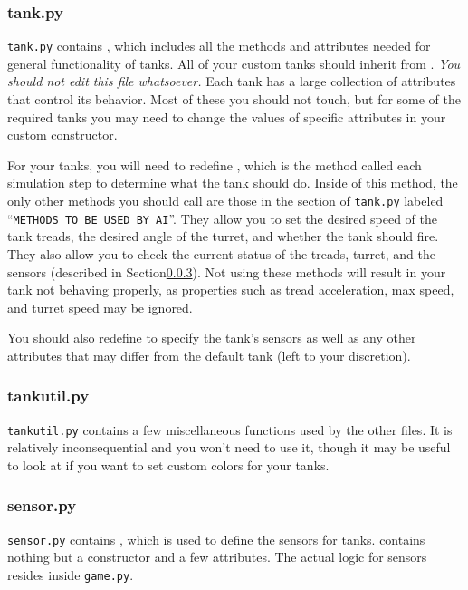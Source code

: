 \documentclass[11pt]{cselabheader}
\begin{document}
\subsubsection{tank.py}
\texttt{tank.py} contains , which includes all the
methods and attributes needed for general functionality of tanks. All of your
custom tanks should inherit from . \emph{You should not edit
this file whatsoever.} Each tank has a large collection of attributes that
control its behavior. Most of these you should not touch, but for some of the
required tanks you may need to change the values of specific attributes in
your custom constructor.

For your tanks, you will need to redefine
, which is the method called each simulation step
to determine what the tank should do. Inside of this method, the only other
methods you should call are those in the section of \texttt{tank.py} labeled
``\texttt{METHODS TO BE USED BY AI}''. They allow you to set the desired speed
of the tank treads, the desired angle of the turret, and whether the tank should
fire. They also allow you to check the current status of the treads, turret, and
the sensors (described in Section\ref{subsubsec:sensor}). Not using these
methods will result in your tank not behaving properly, as properties such as
tread acceleration, max speed, and turret speed may be ignored.

You should also redefine  to specify the tank's sensors as
well as any other attributes that may differ from the default tank (left to your
discretion).

\subsubsection{tankutil.py}
\texttt{tankutil.py} contains a few miscellaneous functions used by the other
files. It is relatively inconsequential and you won't need to use it, though it
may be useful to look at if you want to set custom colors for your tanks.

\subsubsection{sensor.py}
\label{subsubsec:sensor}
\texttt{sensor.py} contains , which is used to define
the sensors for tanks.  contains nothing but a constructor
and a few attributes. The actual logic for sensors resides inside
\texttt{game.py}.
\end{document}
